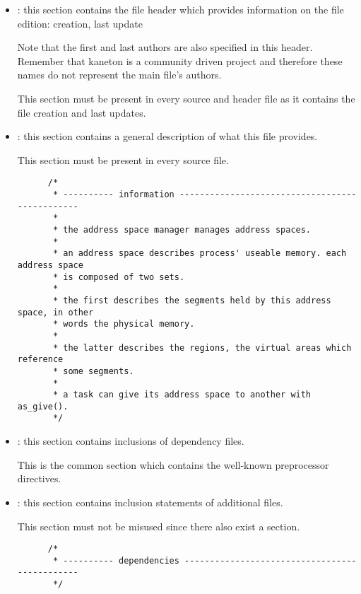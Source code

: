 \begin{itemize}
  \item
    : this section contains the file header which provides
    information on the file edition: creation, last update \etc{}

    \-

    Note that the first and last authors are also specified in this header.
    Remember that kaneton is a community driven project and therefore these
    names do not represent the main file's authors.

    \-

    This section must be present in every source and header file as it
    contains the file creation and last updates.
  \item
    : this section contains a general description of
    what this file provides.

    \-

    This section must be present in every source file.

    \begin{verbatim}
      /*
       * ---------- information -----------------------------------------------
       *
       * the address space manager manages address spaces.
       *
       * an address space describes process' useable memory. each address space
       * is composed of two sets.
       *
       * the first describes the segments held by this address space, in other
       * words the physical memory.
       *
       * the latter describes the regions, the virtual areas which reference
       * some segments.
       *
       * a task can give its address space to another with as_give().
       */
    \end{verbatim}
  \item
    : this section contains inclusions of dependency
    files.

    \-

    This is the common section which contains the well-known 
    preprocessor directives.
  \item
    : this section contains inclusion statements of additional
    files.

    \-

    This section must not be misused since there also exist a
     section.

    \begin{verbatim}
      /*
       * ---------- dependencies ----------------------------------------------
       */


\end{verbatim}
\end{itemize}
